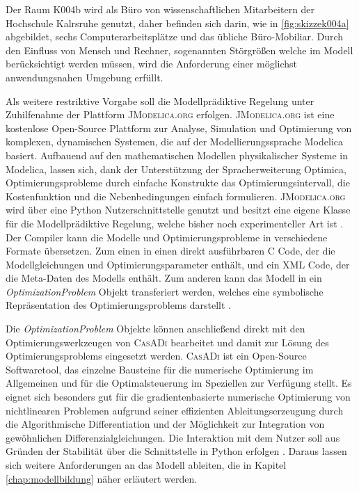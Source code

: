 Der Raum K004b wird als Büro von wissenschaftlichen Mitarbeitern der Hochschule Kalrsruhe genutzt, daher befinden sich darin, wie in \ref{fig:skizzek004a} abgebildet, sechs Computerarbeitsplätze und das übliche Büro-Mobiliar. Durch  den Einfluss von Mensch und Rechner, sogenannten Störgrößen welche im Modell berücksichtigt werden müssen, wird die Anforderung einer möglichst anwendungsnahen Umgebung erfüllt.

Als weitere restriktive Vorgabe soll die Modellprädiktive Regelung unter Zuhilfenahme der Plattform \textsc{JModelica.org} erfolgen. \textsc{JModelica.org} ist eine kostenlose Open-Source Plattform	 zur Analyse, Simulation und Optimierung von komplexen, dynamischen Systemen, die auf der Modellierungssprache Modelica basiert. Aufbauend auf den mathematischen Modellen physikalischer Systeme in Modelica, lassen sich, dank der Unterstützung der Spracherweiterung Optimica, Optimierungsprobleme durch einfache Konstrukte das Optimierungsintervall, die Kostenfunktion und die Nebenbedingungen einfach formulieren. \textsc{JModelica.org} wird über eine Python Nutzerschnittstelle genutzt und besitzt eine eigene Klasse für die Modellprädiktive Regelung, welche bisher noch experimenteller Art ist \cite[S.~1f.]{jmod15}.
Der Compiler kann die Modelle und Optimierungsprobleme in verschiedene Formate übersetzen. Zum einen in einen direkt ausführbaren C Code, der die Modellgleichungen und Optimierungsparameter enthält, und ein XML Code, der die Meta-Daten des Modells enthält. Zum anderen kann das Modell in ein \textit{OptimizationProblem} Objekt transferiert werden, welches eine symbolische Repräsentation des Optimierungsproblems darstellt \cite[S.~12ff.]{jmod15}.

Die \textit{OptimizationProblem} Objekte können anschließend direkt mit den Optimierungswerkzeugen von \textsc{CasADi} bearbeitet und damit zur Lösung des Optimierungsproblems eingesetzt werden. \textsc{CasADi} ist ein Open-Source Softwaretool, das einzelne Bausteine für die numerische Optimierung im Allgemeinen und für die Optimalsteuerung im Speziellen zur Verfügung stellt. Es eignet sich besonders gut für die gradientenbasierte numerische Optimierung von nichtlinearen Problemen aufgrund seiner effizienten Ableitungserzeugung durch die Algorithmische Differentiation und der Möglichkeit zur Integration von gewöhnlichen Differenzialgleichungen. Die Interaktion mit dem Nutzer soll aus Gründen der Stabilität über die Schnittstelle in Python erfolgen \cite[S.~5f.]{casadi}.
Daraus lassen sich weitere Anforderungen an das Modell ableiten, die in Kapitel \ref{chap:modellbildung} näher erläutert werden.

